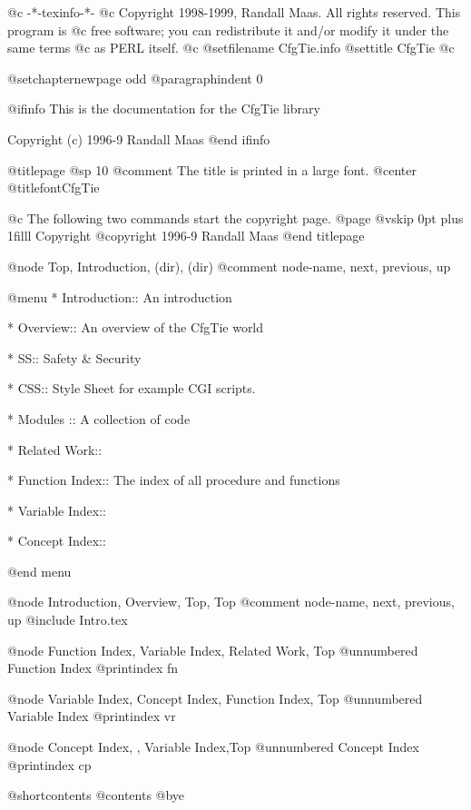    @c -*-texinfo-*-
@c Copyright 1998-1999, Randall Maas.  All rights reserved.  This program is
@c free software; you can redistribute it and/or modify it under the same terms
@c as PERL itself.                                                                   
@c %
@setfilename CfgTie.info
@settitle CfgTie
@c %

@setchapternewpage odd
@paragraphindent 0

@ifinfo
This is the documentation for the CfgTie library

Copyright (c) 1996-9 Randall Maas
@end ifinfo

@titlepage
@sp 10
@comment The title is printed in a large font.
@center @titlefont{CfgTie}

@c The following two commands start the copyright page.
@page
@vskip 0pt plus 1filll
Copyright @copyright{} 1996-9 Randall Maas
@end titlepage

@node    Top,       Introduction,  (dir),    (dir)
@comment node-name, next,          previous, up

@menu
* Introduction::           An introduction

* Overview::		   An overview of the CfgTie world

* SS::			   Safety & Security

* CSS::                    Style Sheet for example CGI scripts.

* Modules ::               A collection of code

* Related Work::

* Function Index::         The index of all procedure and functions

* Variable Index::

* Concept Index::

@end menu

@node    Introduction, Overview, Top,      Top
@comment node-name,    next,                  previous, up
@include Intro.tex

@node Function Index, Variable Index, Related Work, Top
@unnumbered Function Index
@printindex fn

@node Variable Index, Concept Index, Function Index, Top
@unnumbered Variable Index
@printindex vr

@node Concept Index, , Variable Index,Top
@unnumbered Concept Index
@printindex cp


@shortcontents
@contents
@bye

